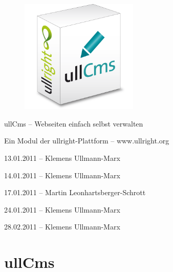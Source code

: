 \documentclass[article, a4paper, oneside, 11pt]{memoir}
\begin{document}
\vspace*{3cm}
\begin{figure}[htp]
\centering
\includegraphics[width=0.5\textwidth]{softwarebox}
\end{figure}

\vspace{3cm}

{%
\huge
\color{ullblue}
ullCms -- Webseiten einfach selbst verwalten
}

\vspace{0.2cm}

{%
\large
Ein Modul der ullright-Plattform -- www.ullright.org
}

\vspace{1cm}

{%
\footnotesize
13.01.2011 -- Klemens Ullmann-Marx

14.01.2011 -- Klemens Ullmann-Marx

17.01.2011 -- Martin Leonhartsberger-Schrott

24.01.2011 -- Klemens Ullmann-Marx

28.02.2011 -- Klemens Ullmann-Marx
}

\clearpage

\pagestyle{plain}


\setcounter{secnumdepth}{2}
\setcounter{tocdepth}{2}
\tableofcontents*

\clearpage

\addtocounter{chapter}{1}

\chapter*{ullCms}
\end{document}
